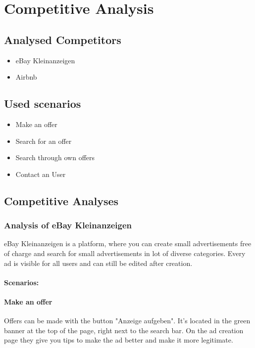 \section{Competitive Analysis}\label{Competitive Analysis}

\subsection{Analysed Competitors}

\begin{itemize}
	\item eBay Kleinanzeigen
	\item Airbnb
\end{itemize}

\subsection{Used scenarios}

\begin{itemize}
	\item Make an offer
	\item Search for an offer
	\item Search through own offers
	\item Contact an User
\end{itemize}

\subsection{Competitive Analyses}

	\subsubsection{Analysis of eBay Kleinanzeigen}
		eBay Kleinanzeigen is a platform, where you can create small advertisements free of charge and search for small advertisements in lot of diverse categories. Every ad is visible for all users and can still be edited after creation.
		
		\paragraph{Scenarios:}
		
		\paragraph{Make an offer} 
		Offers can be made with the button "Anzeige aufgeben". It's located in the green banner at the top of the page, right next to the search bar. On the ad creation page they give you tips to make the ad better and make it more legitimate.
		
